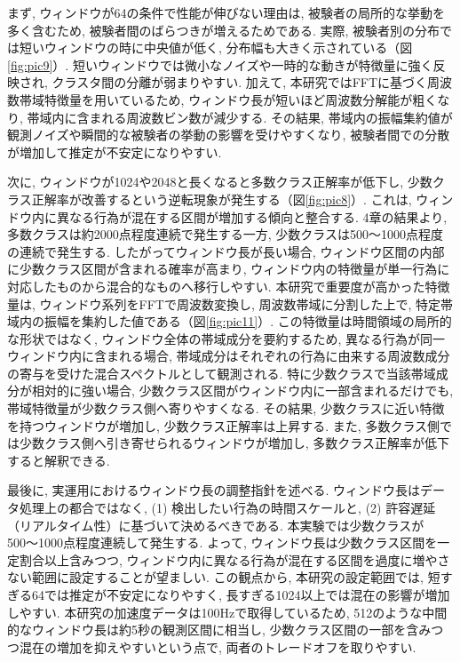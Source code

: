 \documentclass[a4paper,12pt]{jreport}
\begin{document}
まず, ウィンドウが64の条件で性能が伸びない理由は, 被験者の局所的な挙動を多く含むため, 被験者間のばらつきが増えるためである. 実際, 被験者別の分布では短いウィンドウの時に中央値が低く, 分布幅も大きく示されている（図\ref{fig:pic9}）. 短いウィンドウでは微小なノイズや一時的な動きが特徴量に強く反映され, クラスタ間の分離が弱まりやすい. 加えて, 本研究ではFFTに基づく周波数帯域特徴量を用いているため, ウィンドウ長が短いほど周波数分解能が粗くなり, 帯域内に含まれる周波数ビン数が減少する. その結果, 帯域内の振幅集約値が観測ノイズや瞬間的な被験者の挙動の影響を受けやすくなり, 被験者間での分散が増加して推定が不安定になりやすい. 

次に, ウィンドウが1024や2048と長くなると多数クラス正解率が低下し, 少数クラス正解率が改善するという逆転現象が発生する（図\ref{fig:pic8}）.  これは, ウィンドウ内に異なる行為が混在する区間が増加する傾向と整合する. 4章の結果より, 多数クラスは約2000点程度連続で発生する一方, 少数クラスは500〜1000点程度の連続で発生する. したがってウィンドウ長が長い場合, ウィンドウ区間の内部に少数クラス区間が含まれる確率が高まり, ウィンドウ内の特徴量が単一行為に対応したものから混合的なものへ移行しやすい. 本研究で重要度が高かった特徴量は, ウィンドウ系列をFFTで周波数変換し, 周波数帯域に分割した上で, 特定帯域内の振幅を集約した値である（図\ref{fig:pic11}）. この特徴量は時間領域の局所的な形状ではなく, ウィンドウ全体の帯域成分を要約するため, 異なる行為が同一ウィンドウ内に含まれる場合, 帯域成分はそれぞれの行為に由来する周波数成分の寄与を受けた混合スペクトルとして観測される. 特に少数クラスで当該帯域成分が相対的に強い場合, 少数クラス区間がウィンドウ内に一部含まれるだけでも, 帯域特徴量が少数クラス側へ寄りやすくなる. その結果, 少数クラスに近い特徴を持つウィンドウが増加し, 少数クラス正解率は上昇する.  また, 多数クラス側では少数クラス側へ引き寄せられるウィンドウが増加し, 多数クラス正解率が低下すると解釈できる. 

最後に, 実運用におけるウィンドウ長の調整指針を述べる. ウィンドウ長はデータ処理上の都合ではなく, (1) 検出したい行為の時間スケールと, (2) 許容遅延（リアルタイム性）に基づいて決めるべきである. 本実験では少数クラスが500〜1000点程度連続して発生する.  よって,  ウィンドウ長は少数クラス区間を一定割合以上含みつつ, ウィンドウ内に異なる行為が混在する区間を過度に増やさない範囲に設定することが望ましい. この観点から, 本研究の設定範囲では, 短すぎる64では推定が不安定になりやすく, 長すぎる1024以上では混在の影響が増加しやすい. 本研究の加速度データは100Hzで取得しているため, 512のような中間的なウィンドウ長は約5秒の観測区間に相当し, 少数クラス区間の一部を含みつつ混在の増加を抑えやすいという点で, 両者のトレードオフを取りやすい. 
\end{document}
